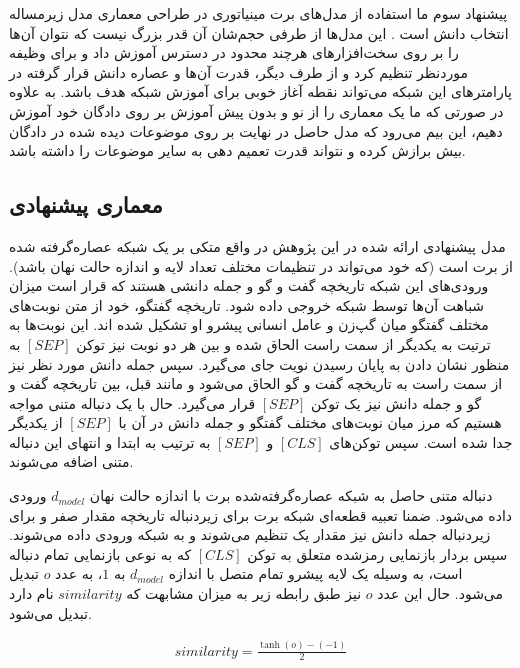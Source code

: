 پیشنهاد سوم ما استفاده از مدل‌های برت مینیاتوری در طراحی معماری مدل زیرمساله انتخاب دانش است
\cite{turc2019well}.
این مدل‌ها از طرفی حجم‌شان آن قدر بزرگ نیست که نتوان آن‌ها را بر روی سخت‌افزار‌های هرچند محدود در دسترس آموزش داد و برای وظیفه موردنظر تنظیم کرد و از طرف دیگر، قدرت آ‌ن‌ها و عصاره دانش قرار گرفته در پارامتر‌های این شبکه می‌تواند نقطه آغاز خوبی برای آموزش شبکه هدف باشد. به علاوه در صورتی که ما یک معماری را از نو و بدون پیش آموزش بر روی دادگان خود آموزش دهیم، این بیم می‌رود که مدل حاصل در نهایت بر روی موضوعات دیده شده در دادگان بیش برازش کرده و نتواند قدرت تعمیم دهی به سایر موضوعات را داشته باشد. 

\subsection{معماری پیشنهادی}\label{chap4:knowledge_selction:arch}

مدل پیشنهادی ارائه شده در این پژوهش در واقع  متکی بر یک شبکه عصاره‌‌گرفته شده از برت است (که خود می‌تواند در تنظیمات مختلف تعداد لایه و اندازه حالت نهان باشد). 
ورودی‌های این شبکه تاریخچه گفت و گو و جمله دانشی هستند که قرار است میزان شباهت آن‌ها توسط شبکه خروجی داده شود. تاریخچه گفتگو، خود از متن نوبت‌های مختلف گفتگو میان گپ‌زن و عامل انسانی پیشرو او تشکیل شده اند. این نوبت‌ها به ترتیت به یکدیگر از سمت راست الحاق شده و بین هر دو نوبت نیز توکن 
$[SEP]$
به منظور نشان دادن به پایان رسیدن نویت جای می‌گیرد. سپس جمله دانش مورد نظر نیز از سمت راست به تاریخچه گفت و گو الحاق می‌شود و مانند قبل، بین تاریخچه گفت و گو و جمله دانش نیز یک توکن 
$[SEP]$
قرار می‌گیرد. حال با یک دنباله متنی مواجه هستیم که مرز میان نوبت‌های مختلف گفتگو و جمله دانش در آن با 
$[SEP]$
از یکدیگر جدا شده است. سپس توکن‌های 
$[CLS]$
و 
$[SEP]$
به ترتیب به ابتدا و انتهای این دنباله متنی اضافه می‌شوند. 

دنباله متنی حاصل به شبکه عصاره‌گرفته‌شده برت 
با اندازه حالت نهان 
$d_{model}$
ورودی داده می‌شود.
ضمنا تعبیه قطعه‌ای شبکه برت برای زیردنباله تاریخچه مقدار صفر و برای زیردنباله جمله دانش نیز مقدار یک تنظیم می‌شوند و به شبکه ورودی داده می‌شوند. 
 سپس بردار بازنمایی رمزشده متعلق به توکن
$[CLS] $
که به نوعی بازنمایی تمام دنباله است،‌ به وسیله 
یک لایه پیشرو تمام متصل با اندازه
$d_{model}$
به 
$1$،
 به عدد 
 $o$
  تبدیل می‌شود. حال این عدد $o$ نیز طبق رابطه زیر به میزان مشابهت که $similarity$ نام دارد تبدیل می‌شود. 
  
  \begin{gather}\label{eq:similarity_equation}
  similarity = \frac{\tanh{(o)}-(-1)}{2}
  \end{gather}

